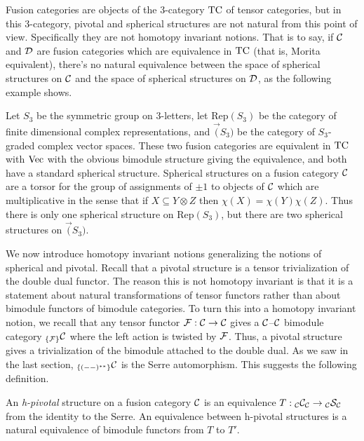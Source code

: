 \documentclass{amsart}
\begin{document}
Fusion categories are objects of the 3-category $\TC$ of tensor categories, but in this 3-category, pivotal and spherical structures are not natural from this point of view.  Specifically they are not homotopy invariant notions.  That is to say, if $\cC$ and $\cD$ are fusion categories which are equivalence in $\TC$ (that is, Morita equivalent), there's no natural equivalence between the space of spherical structures on $\cC$ and the space of spherical structures on $\cD$, as the following example shows.

\begin{example}
Let $S_3$ be the symmetric group on $3$-letters, let $\mathrm{Rep}(S_3)$ be the category of finite dimensional complex representations, and $\Vec(S_3)$ be the category of $S_3$-graded complex vector spaces.  These two fusion categories are equivalent in $\TC$ with $\Vec$ with the obvious bimodule structure giving the equivalence, and both have a standard spherical structure.  Spherical structures on a fusion category $\cC$ are a torsor for the group of assignments of $\pm 1$ to objects of $\cC$ which are multiplicative in the sense that if $X \subseteq Y \otimes Z$ then $\chi(X) = \chi(Y) \chi(Z)$.  Thus there is only one spherical structure on $\mathrm{Rep}(S_3)$, but there are two spherical structures on $\Vec(S_3)$.
\end{example}

We now introduce homotopy invariant notions generalizing the notions of spherical and pivotal.   Recall that a pivotal structure is a tensor trivialization of the double dual functor.  The reason this is not homotopy invariant is that it is a statement about natural transformations of tensor functors rather than about bimodule functors of bimodule categories.  To turn this into a homotopy invariant notion, we recall that any tensor functor $\cF: \cC \rightarrow \cC$ gives a $\cC$--$\cC$ bimodule category ${}_{\{\cF\}}\cC$ where the left action is twisted by $\cF$.  Thus, a pivotal structure gives a trivialization of the bimodule attached to the double dual.  As we saw in the last section, ${}_{\{(--)^{**}\}}\cC$ is the Serre automorphism.  This suggests the following definition.

\begin{definition}
An \emph{h-pivotal} structure on a fusion category $\cC$ is an equivalence $T: \bimod{\cC}{\cC}{\cC} \ra \bimod{\cC}{\cS}{\cC}$ from the identity to the Serre.  An equivalence between h-pivotal structures is a natural equivalence of bimodule functors from $T$ to $T'$.
\end{definition}
\end{document}

